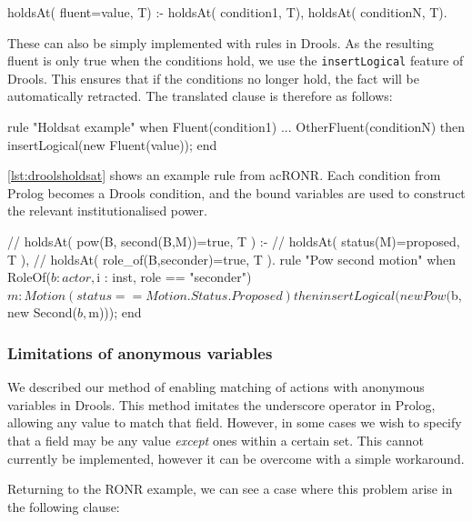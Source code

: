 \begin{prologinline}
holdsAt( fluent=value, T) :-
	holdsAt( condition1, T),
	holdsAt( conditionN, T).
\end{prologinline}

These can also be simply implemented with rules in Drools. As the resulting fluent is only true when the conditions hold, we use the \texttt{insertLogical} feature of Drools. This ensures that if the conditions no longer hold, the fact will be automatically retracted. The translated clause is therefore as follows:

\begin{droolsinline}
rule "Holdsat example"
when
	Fluent(condition1)
	...
	OtherFluent(conditionN)
then
	insertLogical(new Fluent(value));
end
\end{droolsinline}

\autoref{lst:droolsholdsat} shows an example rule from ac{RONR}. Each
condition from Prolog becomes a Drools condition, and the bound variables are
used to construct the relevant institutionalised power.

\begin{drools}[label=lst:droolsholdsat,caption={[Example of a translated RONR holdsAt clause.]Example of a translated RONR holdsAt clause. Original Prolog specification is shown in the comment the rule.}]
//	holdsAt( pow(B, second(B,M))=true, T ) :-
//		holdsAt( status(M)=proposed, T ),
//		holdsAt( role_of(B,seconder)=true, T ).
rule "Pow second motion"
	when
		RoleOf($b : actor, $i : inst, role == "seconder")
		$m : Motion(status == Motion.Status.Proposed)
	then
		insertLogical(new Pow($b, new Second($b, $m)));
end
\end{drools}

\subsubsection*{Limitations of anonymous variables}

We described our method of enabling matching of actions with anonymous
variables in Drools. This method imitates the underscore operator in Prolog,
allowing any value to match that field. However, in some cases we wish to
specify that a field may be any value \emph{except} ones within a certain set.
This cannot currently be implemented, however it can be overcome with a simple
workaround.

Returning to the \ac{RONR} example, we can see a case where this problem arise in the following clause:

